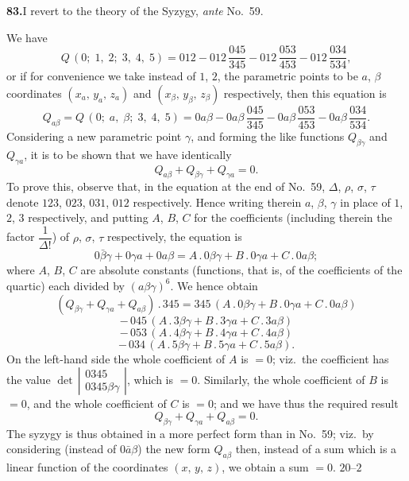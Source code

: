 \documentclass[11pt,a4paper]{article}
\theoremstyle{plain}
\theoremstyle{definition}
\theoremstyle{remark}
\begin{document}
\medskip\noindent\textbf{83.}\quad I revert to the theory of the Syzygy, \textit{ante} No.\ 59.

We have
\[
Q\,(0;\;1,\;2;\;3,\;4,\;5) = 012 - 012\,\frac{045}{345} - 012\,\frac{053}{453} - 012\,\frac{034}{534},
\]
or if for convenience we take instead of $1$, $2$, the parametric points to be $a$, $\beta$ coordinates $(x_a,\,y_a,\,z_a)$ and $(x_\beta,\,y_\beta,\,z_\beta)$ respectively, then this equation is
\[
Q_{a\beta} = Q\,(0;\;a,\;\beta;\;3,\;4,\;5) = 0a\beta - 0a\beta\,\frac{045}{345} - 0a\beta\,\frac{053}{453} - 0a\beta\,\frac{034}{534}.
\]
Considering a new parametric point $\gamma$, and forming the like functions $Q_{\beta\gamma}$ and $Q_{\gamma a}$, it is to be shown that we have identically
\[
Q_{a\beta} + Q_{\beta\gamma} + Q_{\gamma a} = 0.
\]
To prove this, observe that, in the equation at the end of No.\ 59, $\Delta$, $\rho$, $\sigma$, $\tau$ denote $123$, $023$, $031$, $012$ respectively. Hence writing therein $a$, $\beta$, $\gamma$ in place of $1$, $2$, $3$ respectively, and putting $A$, $B$, $C$ for the coefficients (including therein the factor $\dfrac{1}{\Delta!}$) of $\rho$, $\sigma$, $\tau$ respectively, the equation is
\[
0\bar{\beta}\gamma + 0\gamma a + 0a\beta = A\,.\,0\beta\gamma + B\,.\,0\gamma a + C\,.\,0a\beta;
\]
where $A$, $B$, $C$ are absolute constants (functions, that is, of the coefficients of the quartic) each divided by $(a\beta\gamma)^{6}$. We hence obtain
\[
(Q_{\beta\gamma} + Q_{\gamma a} + Q_{a\beta})\,.\,345 = 345\,(A\,.\,0\beta\gamma + B\,.\,0\gamma a + C\,.\,0a\beta)
\]
\[
-\,045\,(A\,.\,3\beta\gamma + B\,.\,3\gamma a + C\,.\,3a\beta)
\]
\[
-\,053\,(A\,.\,4\beta\gamma + B\,.\,4\gamma a + C\,.\,4a\beta)
\]
\[
-\,034\,(A\,.\,5\beta\gamma + B\,.\,5\gamma a + C\,.\,5a\beta).
\]
On the left-hand side the whole coefficient of $A$ is $= 0$; viz.\ the coefficient has the value $\det\,\left|\begin{array}{c}0345\\0345\beta\gamma\end{array}\right|$, which is $= 0$. Similarly, the whole coefficient of $B$ is $= 0$, and the whole coefficient of $C$ is $= 0$; and we have thus the required result
\[
Q_{\beta\gamma} + Q_{\gamma a} + Q_{a\beta} = 0.
\]
The syzygy is thus obtained in a more perfect form than in No.\ 59; viz.\ by considering (instead of $0\bar{a}\beta$) the new form $Q_{a\beta}$ then, instead of a sum which is a linear function of the coordinates $(x,\,y,\,z)$, we obtain a sum $= 0$.
\hfill $20$--$2$
\end{document}
